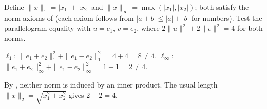 \documentclass[10pt]{scrartcl}
\begin{document}
\begin{example*}
  Define $\|x\|_1=|x_1|+|x_2|$ and $\|x\|_\infty=\max(|x_1|,|x_2|)$; both satisfy the norm axioms of  (each axiom follows from $|a+b|\le|a|+|b|$ for numbers). Test the parallelogram equality with $u=e_1$, $v=e_2$, where $2\|u\|^2+2\|v\|^2=4$ for both norms.
  \begin{itemize}
    \ii $\ell_1$: $\|e_1+e_2\|_1^2+\|e_1-e_2\|_1^2=4+4=8\ne4$.
    \ii $\ell_\infty$: $\|e_1+e_2\|_\infty^2+\|e_1-e_2\|_\infty^2=1+1=2\ne4$.
  \end{itemize}
  By , neither norm is induced by an inner product. The usual length $\|x\|_2=\sqrt{x_1^2+x_2^2}$ gives $2+2=4$.
\end{example*}
\end{document}
